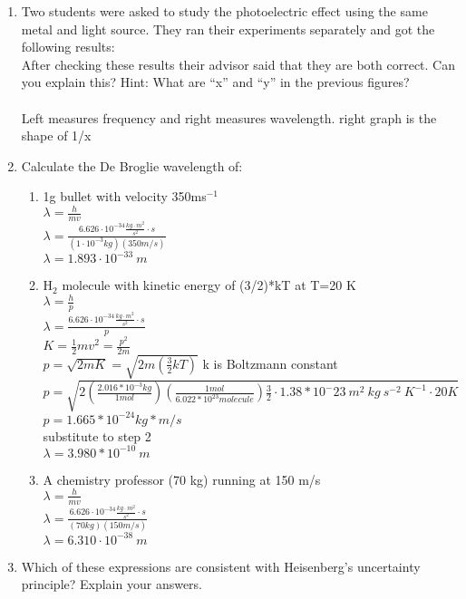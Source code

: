 \documentclass{article}
\begin{document}
\begin{enumerate}
\item Two students were asked to study the photoelectric effect using the same metal and light 
source. They ran their experiments separately and got the following results: 
\\After  checking  these  results  their  advisor  said  that  they  are  both  correct.  Can  you  explain 
this? Hint: What are “x” and “y” in the previous figures? 
\\ \\ Left measures frequency and right measures wavelength. right graph is the shape of 1/x
\item Calculate the De Broglie wavelength of: 
    \begin{enumerate}
    \item 1g bullet with velocity 350ms$^{-1}$
    \\ $\lambda =\frac{h}{mv}$
    \\ $\lambda = \frac{6.626 \cdot 10^{-34} \frac{kg\cdot m^2}{s^2}\cdot s}{(1 \cdot 10^{-3} kg)(350 m/s)}$
    \\ $\lambda = 1.893\cdot10^{-33}~m$
    \item H$_2$ molecule with kinetic energy of (3/2)*kT at T=20 K
    \\ $\lambda =\frac{h}{p}$
    \\ $\lambda = \frac{6.626 \cdot 10^{-34} \frac{kg\cdot m^2}{s^2}\cdot s}{p}$
    \\$K=\frac{1}{2}mv^2=\frac{p^2}{2m}$
    \\ $p=\sqrt{2mK}=\sqrt{2m(\frac{3}{2}kT)}$  \qquad k is Boltzmann constant
    \\ $p=\sqrt{2\left(\frac{2.016*10^{-3}kg}{1 mol}\right)\left(\frac{1 mol}{6.022*10^{23} molecule}\right)\frac{3}{2}\cdot1.38*10^-23~m^2~kg~s^{-2}~K^{-1}\cdot20 K}$
    \\ $p=1.665*10^{-24}kg*m/s$
    \\substitute to step 2
    \\ $\lambda = 3.980*10^{-10}~m$
    \item A chemistry professor (70 kg) running at 150 m/s
    \\ $\lambda =\frac{h}{mv}$
    \\ $\lambda = \frac{6.626 \cdot 10^{-34} \frac{kg\cdot m^2}{s^2}\cdot s}{( 70 kg)(150 m/s)}$
    \\ $\lambda = 6.310\cdot10^{-38}~m$
    \end{enumerate}
\item  Which of these expressions are consistent with Heisenberg’s uncertainty principle? Explain your answers.

\end{enumerate}
\end{document}
